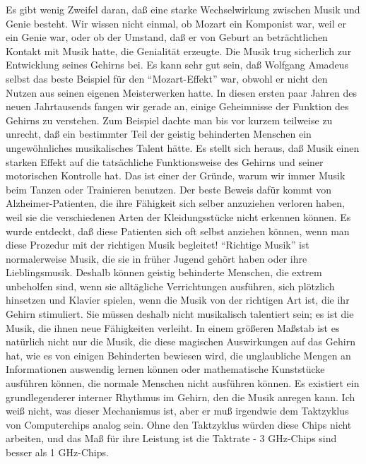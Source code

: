 Es gibt wenig Zweifel daran, daß eine starke Wechselwirkung zwischen Musik und Genie besteht.
Wir wissen nicht einmal, ob Mozart ein Komponist war, weil er ein Genie war, oder ob der Umstand, daß er von Geburt an beträchtlichen Kontakt mit Musik hatte, die Genialität erzeugte.
Die Musik trug sicherlich zur Entwicklung seines Gehirns bei.
Es kann sehr gut sein, daß Wolfgang Amadeus selbst das beste Beispiel für den \enquote{Mozart-Effekt} war, obwohl er nicht den Nutzen aus seinen eigenen Meisterwerken hatte.
In diesen ersten paar Jahren des neuen Jahrtausends fangen wir gerade an, einige Geheimnisse der Funktion des Gehirns zu verstehen.
Zum Beispiel dachte man bis vor kurzem teilweise zu unrecht, daß ein bestimmter Teil der geistig behinderten Menschen ein ungewöhnliches musikalisches Talent hätte.
Es stellt sich heraus, daß Musik einen starken Effekt auf die tatsächliche Funktionsweise des Gehirns und seiner motorischen Kontrolle hat.
Das ist einer der Gründe, warum wir immer Musik beim Tanzen oder Trainieren benutzen.
Der beste Beweis dafür kommt von Alzheimer-Patienten, die ihre Fähigkeit sich selber anzuziehen verloren haben, weil sie die verschiedenen Arten der Kleidungsstücke nicht erkennen können.
Es wurde entdeckt, daß diese Patienten sich oft selbst anziehen können, wenn man diese Prozedur mit der richtigen Musik begleitet!
\enquote{Richtige Musik} ist normalerweise Musik, die sie in früher Jugend gehört haben oder ihre Lieblingsmusik.
Deshalb können geistig behinderte Menschen, die extrem unbeholfen sind, wenn sie alltägliche Verrichtungen ausführen, sich plötzlich hinsetzen und Klavier spielen, wenn die Musik von der richtigen Art ist, die ihr Gehirn stimuliert.
Sie müssen deshalb nicht musikalisch talentiert sein; es ist die Musik, die ihnen neue Fähigkeiten verleiht.
In einem größeren Maßstab ist es natürlich nicht nur die Musik, die diese magischen Auswirkungen auf das Gehirn hat, wie es von einigen Behinderten bewiesen wird, die unglaubliche Mengen an Informationen auswendig lernen können oder mathematische Kunststücke ausführen können, die normale Menschen nicht ausführen können.
Es existiert ein grundlegenderer interner Rhythmus im Gehirn, den die Musik anregen kann.
Ich weiß nicht, was dieser Mechanismus ist, aber er muß irgendwie dem Taktzyklus von Computerchips analog sein.
Ohne den Taktzyklus würden diese Chips nicht arbeiten, und das Maß für ihre Leistung ist die Taktrate - 3 GHz-Chips sind besser als 1 GHz-Chips.

